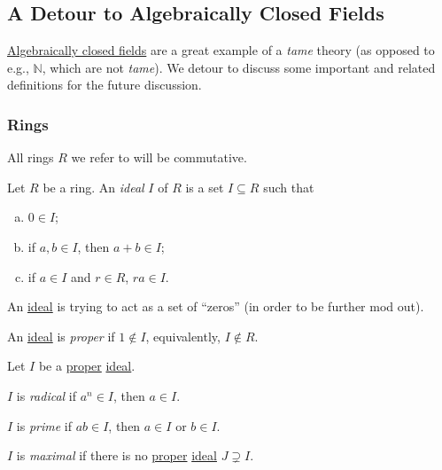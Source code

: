 \subsection{A Detour to Algebraically Closed Fields}
\hyperref[def:algebraically-closed]{Algebraically closed fields} are a great example of a \emph{tame} theory (as opposed to e.g., \(\mathbb{N} \), which are not \emph{tame}). We detour to discuss some important and related definitions for the future discussion.

\subsubsection{Rings}
All rings \(R\) we refer to will be commutative.

\begin{definition}[Ideal]\label{def:ideal}
	Let \(R\) be a ring. An \emph{ideal} \(I\) of \(R\) is a set \(I \subseteq R\) such that
	\begin{enumerate}[(a)]
		\item \(0\in I\);
		\item if \(a, b\in I\), then \(a+b\in I\);
		\item if \(a\in I\) and \(r\in R\), \(ra\in I\).
	\end{enumerate}
\end{definition}

\begin{intuition}
	An \hyperref[def:ideal]{ideal} is trying to act as a set of ``zeros'' (in order to be further mod out).
\end{intuition}

\begin{definition}[Proper]\label{def:proper}
	An \hyperref[def:ideal]{ideal} is \emph{proper} if \(1 \notin I\), equivalently, \(I \notin R\).
\end{definition}

\begin{definition*}
	Let \(I\) be a \hyperref[def:proper]{proper} \hyperref[def:ideal]{ideal}.

	\begin{definition}[Radical]\label{def:radical}
		\(I\) is \emph{radical}	if \(a^n\in I\), then \(a\in I\).
	\end{definition}

	\begin{definition}[Prime]\label{def:prime}
		\(I\) is \emph{prime} if \(ab\in I\), then \(a\in I\) or \(b\in I\).
	\end{definition}

	\begin{definition}[Maximal]\label{def:proper-ideal-maximal}
		\(I\) is \emph{maximal} if there is no \hyperref[def:proper]{proper} \hyperref[def:ideal]{ideal} \(J \supsetneq I \).
	\end{definition}
\end{definition*}

